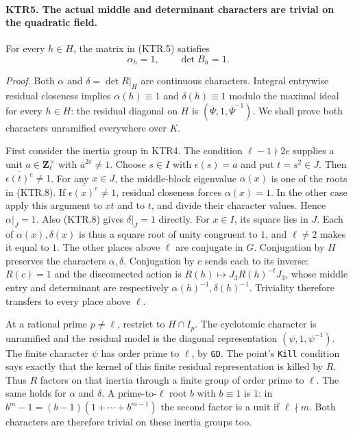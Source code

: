 \documentclass[11pt,a4paper]{article}
\numberwithin{equation}{section}
\theoremstyle{remark}\newtheorem{remark}[theorem]{Remark}
\begin{document}
\paragraph{KTR5. The actual middle and determinant characters are trivial on the quadratic field.}
\label{claim:KTR5}
For every \(h\in H\), the matrix in (KTR.5) satisfies
\[
                          \alpha_h=1,\qquad \det B_h=1.
 \tag{KTR.10}
\]

\emph{Proof.}
Both \(\alpha\) and \(\delta=\det R|_H\) are continuous
characters.  Integral entrywise residual closeness implies
\(\alpha(h)\equiv1\) and \(\delta(h)\equiv1\) modulo
the maximal ideal for every \(h\in H\): the residual diagonal
on \(H\) is \((\overline\Psi,1,\overline\Psi^{-1})\).
We shall prove both characters unramified everywhere over \(K\).

First consider the inertia group in KTR4.  The condition
\(\ell-1\nmid2e\) supplies a unit
\(a\in\mathbf Z_\ell^\times\) with
\(\bar a^{2e}\ne1\).  Choose \(s\in I\) with
\(\epsilon(s)=a\) and put \(t=s^2\in J\).
Then \(\overline{\epsilon(t)^e}\ne1\).
For any \(x\in J\), the middle-block eigenvalue
\(\alpha(x)\) is one of the roots in (KTR.8).
If \(\overline{\epsilon(x)^e}\ne1\), residual closeness
forces \(\alpha(x)=1\).  In the other case apply this
argument to \(xt\) and to \(t\), and divide their character
values.  Hence \(\alpha|_J=1\).  Also (KTR.8) gives
\(\delta|_J=1\) directly.  For \(x\in I\), its square
lies in \(J\).  Each of \(\alpha(x),\delta(x)\) is thus
a square root of unity congruent to \(1\), and \(\ell\ne2\)
makes it equal to \(1\).  The other places above \(\ell\)
are conjugate in \(G\).  Conjugation by \(H\) preserves
the characters \(\alpha,\delta\).  Conjugation by \(c\)
sends each to its inverse: \(R(c)=1\) and the disconnected
action is \(R(h)\mapsto J_3R(h)^{-t}J_3\), whose middle
entry and determinant are respectively
\(\alpha(h)^{-1},\delta(h)^{-1}\).
Triviality therefore transfers to every place above \(\ell\).

At a rational prime \(p\ne\ell\), restrict to
\(H\cap I_p\).  The cyclotomic character is unramified and
the residual model is the diagonal representation
\((\psi,1,\psi^{-1})\).  The finite character \(\psi\)
has order prime to \(\ell\), by \texttt{GD}.  The point's
\texttt{Kill} condition says exactly that the kernel of this
finite residual representation is killed by \(R\).
Thus \(R\) factors on that inertia through a finite group
of order prime to \(\ell\).  The same holds for \(\alpha\)
and \(\delta\).  A prime-to-\(\ell\) root \(b\) with
\(b\equiv1\) is \(1\): in
\(b^m-1=(b-1)(1+\cdots+b^{m-1})\) the second factor is a
unit if \(\ell\nmid m\).  Both characters are therefore
trivial on these inertia groups too.
\end{document}
